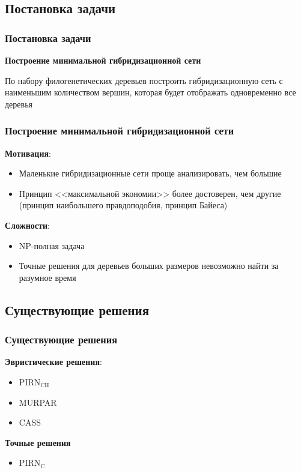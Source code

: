 \documentclass[hyperref={unicode}]{beamer}
\begin{document}
\subsection{Постановка задачи}

\begin{frame}
\frametitle{Постановка задачи}

\textbf{Построение минимальной гибридизационной сети}

По набору филогенетических деревьев построить гибридизационную сеть с наименьшим количеством вершин, которая будет отображать одновременно все деревья

\end{frame}

\begin{frame}
\frametitle{Построение минимальной гибридизационной сети}

\textbf{Мотивация}:
\begin{itemize}
	\item Маленькие гибридизационные сети проще анализировать, чем большие
	\item Принцип <<максимальной экономии>> более достоверен, чем другие (принцип наибольшего правдоподобия, принцип Байеса)
\end{itemize}


\textbf{Сложности}:
\begin{itemize}
	\item NP-полная задача
	\item Точные решения для деревьев больших размеров невозможно найти за разумное время
\end{itemize}

\end{frame}

\subsection{Существующие решения}

\begin{frame}
\frametitle{Существующие решения}

\textbf{Эвристические решения}:
\begin{itemize}
	\item $\mathrm{PIRN_{CH}}$
	\item MURPAR
	\item CASS
\end{itemize}

\textbf{Точные решения}
\begin{itemize}
	\item $\mathrm{PIRN_C}$
\end{itemize}

\end{frame}
\end{document}
